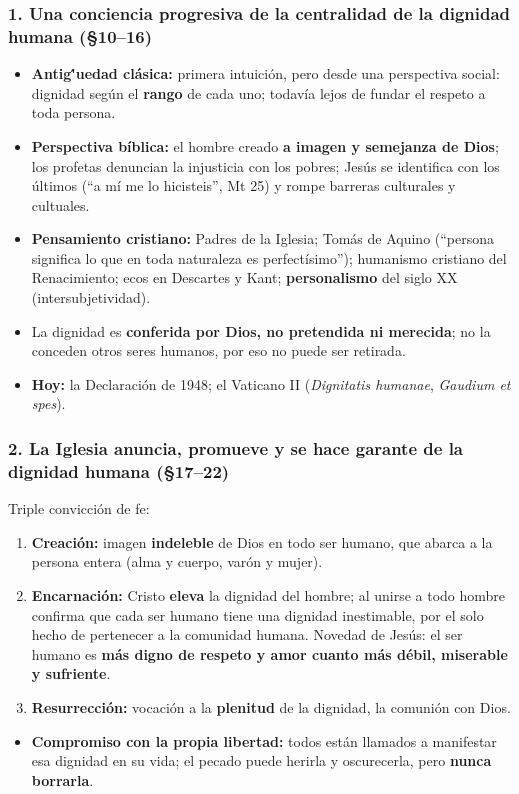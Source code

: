 \documentclass[10pt,a4paper]{article}
\begin{document}
\subsubsection{1. Una conciencia progresiva de la centralidad de la dignidad humana (\S{}10--16)}
\begin{itemize}
\item \textbf{Antig\''uedad clásica:} primera intuición, pero desde una perspectiva social: dignidad según el \textbf{rango} de cada uno; todavía lejos de fundar el respeto a toda persona.
\item \textbf{Perspectiva bíblica:} el hombre creado \textbf{a imagen y semejanza de Dios}; los profetas denuncian la injusticia con los pobres; Jesús se identifica con los últimos (``a mí me lo hicisteis'', Mt 25) y rompe barreras culturales y cultuales.
\item \textbf{Pensamiento cristiano:} Padres de la Iglesia; Tomás de Aquino (``persona significa lo que en toda naturaleza es perfectísimo''); humanismo cristiano del Renacimiento; ecos en Descartes y Kant; \textbf{personalismo} del siglo XX (intersubjetividad).
\item La dignidad es \textbf{conferida por Dios, no pretendida ni merecida}; no la conceden otros seres humanos, por eso no puede ser retirada.
\item \textbf{Hoy:} la Declaración de 1948; el Vaticano II (\textit{Dignitatis humanae}, \textit{Gaudium et spes}).
\end{itemize}

\subsubsection{2. La Iglesia anuncia, promueve y se hace garante de la dignidad humana (\S{}17--22)}
\noindent Triple convicción de fe:\par\smallskip
\begin{enumerate}
\item \textbf{Creación:} imagen \textbf{indeleble} de Dios en todo ser humano, que abarca a la persona entera (alma y cuerpo, varón y mujer).
\item \textbf{Encarnación:} Cristo \textbf{eleva} la dignidad del hombre; al unirse a todo hombre confirma que cada ser humano tiene una dignidad inestimable, por el solo hecho de pertenecer a la comunidad humana. Novedad de Jesús: el ser humano es \textbf{más digno de respeto y amor cuanto más débil, miserable y sufriente}.
\item \textbf{Resurrección:} vocación a la \textbf{plenitud} de la dignidad, la comunión con Dios.
\end{enumerate}
\begin{itemize}
\item \textbf{Compromiso con la propia libertad:} todos están llamados a manifestar esa dignidad en su vida; el pecado puede herirla y oscurecerla, pero \textbf{nunca borrarla}.
\end{itemize}
\end{document}

